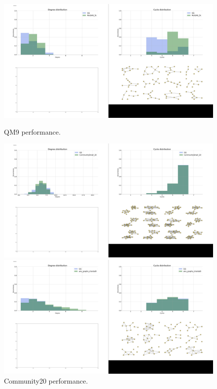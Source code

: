 \begin{figure}[!ht]
    \centering
    \begin{minipage}{0.475\textwidth}
    \centering
    \includegraphics[width=\textwidth]{figures/gggcrp/QM9.pdf}
    \caption[GGG-CRP performance on QM9.]{QM9 performance.}
    \label{fig:qm9}    
    \end{minipage}
    \hfill
    \begin{minipage}{0.475\textwidth}
    \centering
    \includegraphics[width=\textwidth]{figures/gggcrp/CommunitySmall_20.pdf}
    \caption[GGG-CRP performance on Community20.]{Community20 performance.}
    \label{fig:community_20}    
    \end{minipage}
    \begin{minipage}{0.475\textwidth}
    \centering
    \includegraphics[width=\textwidth]{figures/gggcrp/Chordal9.pdf}

\end{minipage}
\end{figure}
